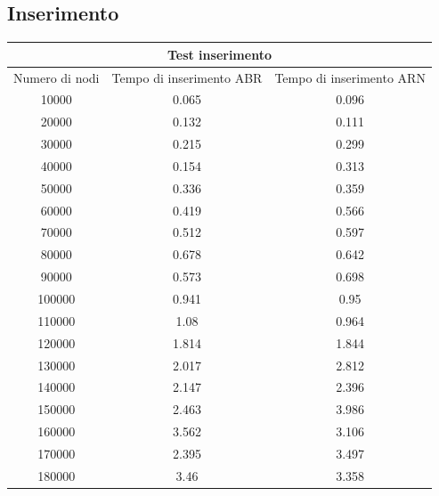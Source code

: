\documentclass{article}
\begin{document}
\subsection{Inserimento}
{\renewcommand{\arraystretch}{0.9}}
{\centering}
\begin{longtable}{c|c|c}
\hline
\multicolumn{3}{c}{Test inserimento}\\
\hline
   Numero di nodi &   Tempo di inserimento ABR &   Tempo di inserimento ARN \\
\hline
            10000 &                      0.065 &                      0.096 \\
            20000 &                      0.132 &                      0.111 \\
            30000 &                      0.215 &                      0.299 \\
            40000 &                      0.154 &                      0.313 \\
            50000 &                      0.336 &                      0.359 \\
            60000 &                      0.419 &                      0.566 \\
            70000 &                      0.512 &                      0.597 \\
            80000 &                      0.678 &                      0.642 \\
            90000 &                      0.573 &                      0.698 \\
           100000 &                      0.941 &                      0.95  \\
           110000 &                      1.08  &                      0.964 \\
           120000 &                      1.814 &                      1.844 \\
           130000 &                      2.017 &                      2.812 \\
           140000 &                      2.147 &                      2.396 \\
           150000 &                      2.463 &                      3.986 \\
           160000 &                      3.562 &                      3.106 \\
           170000 &                      2.395 &                      3.497 \\
           180000 &                      3.46  &                      3.358 \\

\end{longtable}
\end{document}
